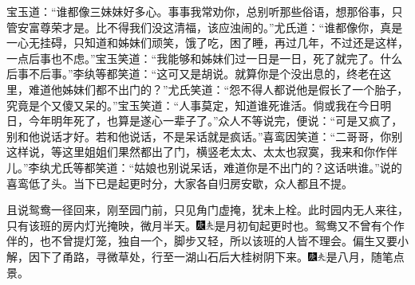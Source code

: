 宝玉道：``谁都像三妹妹好多心。事事我常劝你，总别听那些俗语，想那俗事，只管安富尊荣才是。比不得我们没这清福，该应浊闹的。''尤氏道：``谁都像你，真是一心无挂碍，只知道和姊妹们顽笑，饿了吃，困了睡，再过几年，不过还是这样，一点后事也不虑。''宝玉笑道：``我能够和姊妹们过一日是一日，死了就完了。什么后事不后事。''李纨等都笑道：``这可又是胡说。就算你是个没出息的，终老在这里，难道他姊妹们都不出门的？''尤氏笑道：``怨不得人都说他是假长了一个胎子，究竟是个又傻又呆的。''宝玉笑道：``人事莫定，知道谁死谁活。倘或我在今日明日，今年明年死了，也算是遂心一辈子了。''众人不等说完，便说：``可是又疯了，别和他说话才好。若和他说话，不是呆话就是疯话。''喜鸾因笑道：``二哥哥，你别这样说，等这里姐姐们果然都出了门，横竖老太太、太太也寂寞，我来和你作伴儿。''李纨尤氏等都笑道：``姑娘也别说呆话，难道你是不出门的？这话哄谁。''说的喜鸾低了头。当下已是起更时分，大家各自归房安歇，众人都且不提。

且说鸳鸯一径回来，刚至园门前，只见角门虚掩，犹未上栓。此时园内无人来往，只有该班的房内灯光掩映，微月半天。{\includegraphics[width=3mm]{../Images/00004}\includegraphics[width=3mm]{../Images/00012}\footnotesize \kaishu 是月初旬起更时也。}鸳鸯又不曾有个作伴的，也不曾提灯笼，独自一个，脚步又轻，所以该班的人皆不理会。偏生又要小解，因下了甬路，寻微草处，行至一湖山石后大桂树阴下来。{\includegraphics[width=3mm]{../Images/00004}\includegraphics[width=3mm]{../Images/00012}\footnotesize \kaishu 是八月，随笔点景。}

